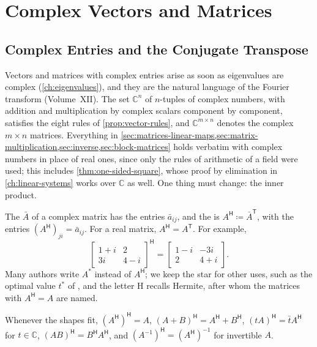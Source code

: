 \section{Complex Vectors and Matrices}
\label{sec:complex-matrices}

\subsection{Complex Entries and the Conjugate Transpose}

Vectors and matrices with complex entries arise as soon as eigenvalues are complex (\cref{ch:eigenvalues}), and they are the natural language of the Fourier transform (Volume~XII). The set $\mathbb C^n$ of $n$-tuples of complex numbers, with addition and multiplication by complex scalars component by component, satisfies the eight rules of \cref{prop:vector-rules}, and $\mathbb C^{m\times n}$ denotes the complex $m\times n$ matrices. Everything in \cref{sec:matrices-linear-maps,sec:matrix-multiplication,sec:inverse,sec:block-matrices} holds verbatim with complex numbers in place of real ones, since only the rules of arithmetic of a field were used; this includes \cref{thm:one-sided-square}, whose proof by elimination in \cref{ch:linear-systems} works over $\mathbb C$ as well. One thing must change: the inner product.

The  $\bar A$ of a complex matrix has the entries $\bar a_{ij}$, and the  is $A^{\mathsf H}\coloneqq\bar A^{\mathsf T}$, with the entries $(A^{\mathsf H})_{ji}=\bar a_{ij}$. For a real matrix, $A^{\mathsf H}=A^{\mathsf T}$. For example,
\[
\begin{bmatrix}1+i&2\\3i&4-i\end{bmatrix}^{\mathsf H}=\begin{bmatrix}1-i&-3i\\2&4+i\end{bmatrix}.
\]
Many authors write $A^*$ instead of $A^{\mathsf H}$; we keep the star for other uses, such as the optimal value $t^*$ of , and the letter H recalls Hermite, after whom the matrices with $A^{\mathsf H}=A$ are named.

\begin{proposition}
\label{prop:conjugate-transpose}
Whenever the shapes fit, $(A^{\mathsf H})^{\mathsf H}=A$, $(A+B)^{\mathsf H}=A^{\mathsf H}+B^{\mathsf H}$, $(tA)^{\mathsf H}=\bar tA^{\mathsf H}$ for $t\in\mathbb C$, $(AB)^{\mathsf H}=B^{\mathsf H}A^{\mathsf H}$, and $(A^{-1})^{\mathsf H}=(A^{\mathsf H})^{-1}$ for invertible $A$.
\end{proposition}

